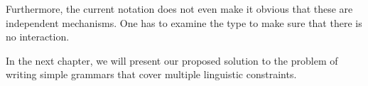 Furthermore, the current notation does not even make it obvious that
these are independent mechanisms. One has to examine the type to make
sure that there is no interaction.

In the next chapter, we will present our proposed solution to the
problem of writing simple grammars that cover multiple linguistic
constraints.

